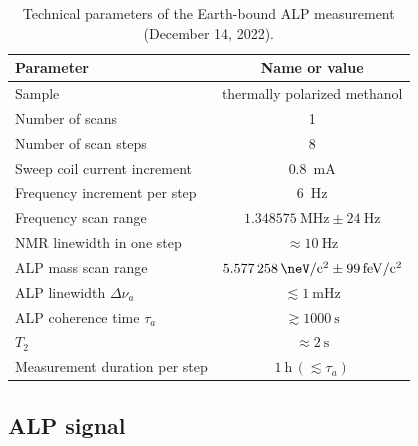 \begin{table}[htb]
    \centering
    \caption{Technical parameters of the Earth-bound ALP measurement (December 14, 2022).}
    \label{tab:earthmeas_params}
    \begin{tabular}{lc}
        \toprule
        Parameter & Name or value \\
        \hline
        Sample & thermally polarized methanol \\
        Number of scans & 1 \\
        Number of scan steps & 8 \\
        Sweep coil current increment & \SI{0.8}{\mA} \\
        Frequency increment per step & \SI{6}{\Hz} \\
        Frequency scan range & $\SI{1.348575}{\MHz} \pm \SI{24}{\Hz}$ \\
        NMR linewidth in one step & $\approx\SI{10}{\Hz}$ \\
        ALP mass scan range & $\SI{5.577258}{\neV/c^2}\pm\SI{99}{\femto\eV/c^2}$ \\
        ALP linewidth $\Delta\nu_a$ & $\lesssim \SI{1}{\mHz}$ \\
        ALP coherence time $\tau_a$ & $\gtrsim \SI{1000}{\s}$ \\
        $T_2$ & $\approx\SI{2}{\s}$ \\
        Measurement duration per step & $\SI{1}{\hour}\,(\lesssim \tau_a) $ \\
        \bottomrule
    \end{tabular}
\end{table}


\subsection{ALP signal}




